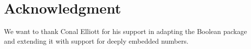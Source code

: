  
\section{Acknowledgment}

We want to thank Conal Elliott for his support in adapting 
the Boolean package \cite{project:boolean} and 
extending it with support for deeply embedded numbers.




